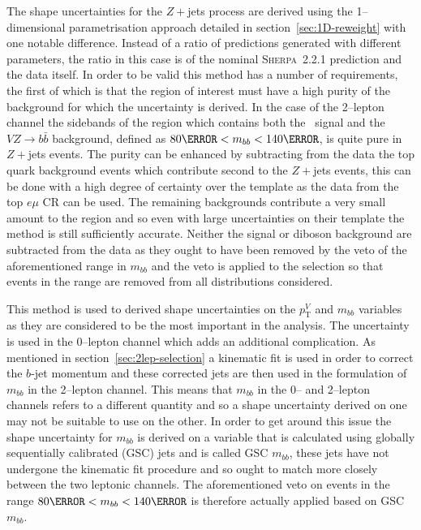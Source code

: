The shape uncertainties for the $Z+$jets process are derived using the
1--dimensional parametrisation approach detailed in
section~\ref{sec:1D-reweight} with one notable difference. Instead of a ratio of
predictions generated with different parameters, the ratio in this case is of
the nominal \textsc{Sherpa}~2.2.1 prediction and the data itself. In order to be
valid this method has a number of requirements, the first of which is that the
region of interest must have a high purity of the background for which the
uncertainty is derived. In the case of the 2--lepton channel the sidebands of
the region which contains both the \VHbb\ signal and the $V\!Z\!\to\! b\bar{b}$
background, defined as  $80 \GeV < m_{bb} < 140 \GeV$, is quite pure in $Z+$jets
events. The purity can be enhanced by subtracting from the data the top quark
background events which contribute second to the $Z+$jets events, this can be
done with a high degree of certainty over the template as the data from the top
$e\mu$ CR can be used. The remaining backgrounds contribute a very small amount
to the region and so even with large uncertainties on their template the method
is still sufficiently accurate. Neither the signal or diboson background are
subtracted from the data as they ought to have been removed by the veto of the
aforementioned range in $m_{bb}$ and the veto is applied to the selection so
that events in the range are removed from all distributions considered.

This method is used to derived shape uncertainties on the $p_{\mathrm{T}}^V$ and $m_{bb}$
variables as they are considered to be the most important in the analysis. The
uncertainty is used in the 0--lepton channel which adds an additional
complication. As mentioned in section~\ref{sec:2lep-selection} a kinematic fit
is used in order to correct the $b$-jet momentum and these corrected jets are then
used in the formulation of $m_{bb}$ in the 2--lepton channel. This means that
$m_{bb}$ in the 0-- and 2--lepton channels refers to a different quantity and so
a shape uncertainty derived on one may not be suitable to use on the other. In
order to get around this issue the shape uncertainty for $m_{bb}$ is derived on
a variable that is calculated using globally sequentially calibrated (GSC) jets
and is called GSC $m_{bb}$, these jets have not undergone the kinematic fit
procedure and so ought to match more closely between the two leptonic channels.
The aforementioned veto on events in the range $80 \GeV < m_{bb} < 140 \GeV$ is
therefore actually applied based on GSC $m_{bb}$.

